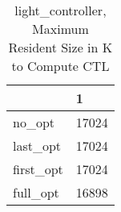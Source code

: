\begin{table}
\caption{light\_controller, Maximum Resident Size in K to Compute CTL}
\label{light_controller_CTL_size}
\begin{tabular}{ll}
\toprule
 & 1 \\
\midrule
no\_opt & 17024 \\
last\_opt & 17024 \\
first\_opt & 17024 \\
full\_opt & 16898 \\
\bottomrule
\end{tabular}
\end{table}
